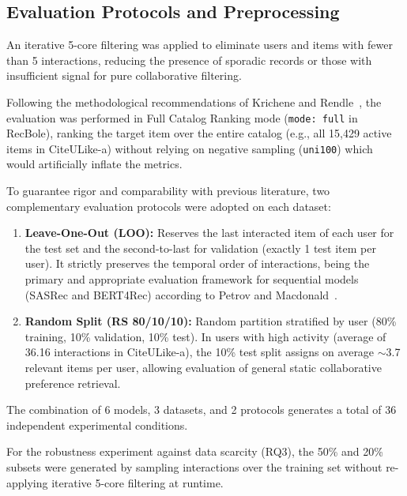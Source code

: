 \documentclass[journal]{IEEEtran}
\begin{document}
\subsection{Evaluation Protocols and Preprocessing}
An iterative 5-core filtering was applied to eliminate users and items with fewer than 5 interactions, reducing the presence of sporadic records or those with insufficient signal for pure collaborative filtering.

Following the methodological recommendations of Krichene and Rendle~\cite{krichene2020sampled}, the evaluation was performed in Full Catalog Ranking mode (\texttt{mode: full} in RecBole), ranking the target item over the entire catalog (e.g., all 15,429 active items in CiteULike-a) without relying on negative sampling (\texttt{uni100}) which would artificially inflate the metrics.

To guarantee rigor and comparability with previous literature, two complementary evaluation protocols were adopted on each dataset:
\begin{enumerate}
    \item \textbf{Leave-One-Out (LOO):} Reserves the last interacted item of each user for the test set and the second-to-last for validation (exactly 1 test item per user). It strictly preserves the temporal order of interactions, being the primary and appropriate evaluation framework for sequential models (SASRec and BERT4Rec) according to Petrov and Macdonald~\cite{petrov2023effective}.
    \item \textbf{Random Split (RS 80/10/10):} Random partition stratified by user (80\% training, 10\% validation, 10\% test). In users with high activity (average of 36.16 interactions in CiteULike-a), the 10\% test split assigns on average $\sim$3.7 relevant items per user, allowing evaluation of general static collaborative preference retrieval.
\end{enumerate}

The combination of 6 models, 3 datasets, and 2 protocols generates a total of 36 independent experimental conditions.

For the robustness experiment against data scarcity (RQ3), the 50\% and 20\% subsets were generated by sampling interactions over the training set without re-applying iterative 5-core filtering at runtime.
\end{document}
